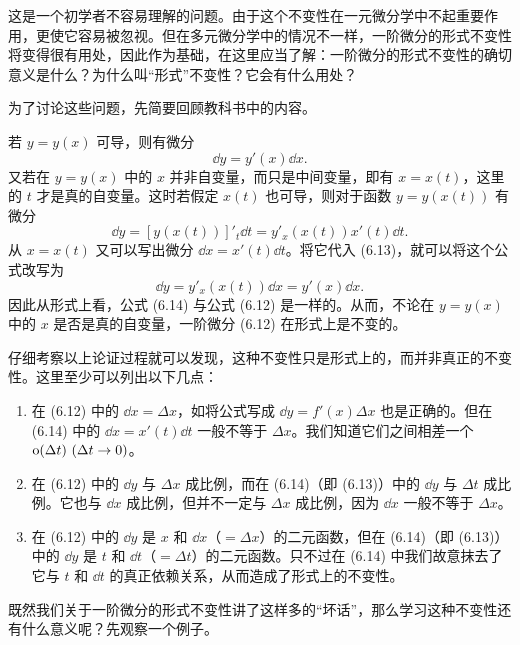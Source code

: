 这是一个初学者不容易理解的问题。由于这个不变性在一元微分学中不起重要作用，更使它容易被忽视。但在多元微分学中的情况不一样，一阶微分的形式不变性将变得很有用处，因此作为基础，在这里应当了解：一阶微分的形式不变性的确切意义是什么？为什么叫“形式”不变性？它会有什么用处？

为了讨论这些问题，先简要回顾教科书中的内容。

若 $y=y(x)$ 可导，则有微分
\begin{equation}
  \dd y=y'(x)\dd x.
  \tag{6.12}
  \label{eq:6.12}
\end{equation}
又若在 $y=y(x)$ 中的 $x$ 并非自变量，而只是中间变量，即有 $x=x(t)$，这里的 $t$ 才是真的自变量。这时若假定 $x(t)$ 也可导，则对于函数 $y=y(x(t))$ 有微分
\begin{equation}
  \dd y=[y(x(t))]'_t\dd t=y'_x(x(t))x'(t)\dd t.
  \tag{6.13}
  \label{eq:6.13}
\end{equation}
从 $x=x(t)$ 又可以写出微分 $\dd x=x'(t)\dd t$。将它代入 (6.13)，就可以将这个公式改写为
\begin{equation}
  \dd y=y'_x(x(t))\dd x=y'(x)\dd x.
  \tag{6.14}
  \label{eq:6.14}
\end{equation}
因此从形式上看，公式 (6.14) 与公式 (6.12) 是一样的。从而，不论在 $y=y(x)$ 中的 $x$ 是否是真的自变量，一阶微分 (6.12) 在形式上是不变的。

仔细考察以上论证过程就可以发现，这种不变性只是形式上的，而并非真正的不变性。这里至少可以列出以下几点：
\begin{enumerate}
  \item 在 (6.12) 中的 $\dd x=\Delta x$，如将公式写成 $\dd y=f'(x)\Delta x$ 也是正确的。但在 (6.14) 中的 $\dd x=x'(t)\dd t$ 一般不等于 $\Delta x$。我们知道它们之间相差一个 $\mathrm{o}(\Delta t)\ (\Delta t\to0)$。
  \item 在 (6.12) 中的 $\dd y$ 与 $\Delta x$ 成比例，而在 (6.14)（即 (6.13)）中的 $\dd y$ 与 $\Delta t$ 成比例。它也与 $\dd x$ 成比例，但并不一定与 $\Delta x$ 成比例，因为 $\dd x$ 一般不等于 $\Delta x$。
  \item 在 (6.12) 中的 $\dd y$ 是 $x$ 和 $\dd x$（$=\Delta x$）的二元函数，但在 (6.14)（即 (6.13)）中的 $\dd y$ 是 $t$ 和 $\dd t$（$=\Delta t$）的二元函数。只不过在 (6.14) 中我们故意抹去了它与 $t$ 和 $\dd t$ 的真正依赖关系，从而造成了形式上的不变性。
\end{enumerate}

既然我们关于一阶微分的形式不变性讲了这样多的“坏话”，那么学习这种不变性还有什么意义呢？先观察一个例子。

